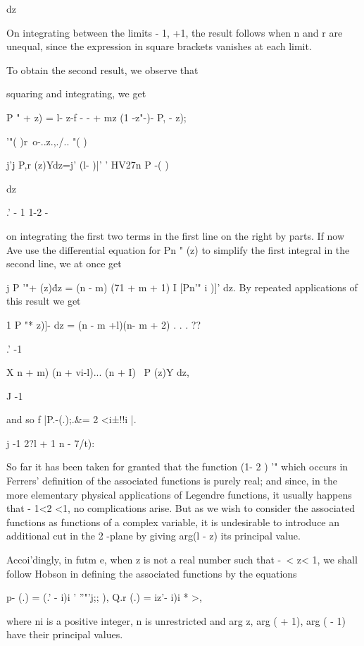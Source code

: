 {{{dz

%
%

On integrating between the limits - 1, +1, the result follows when n
and r are unequal, since the expression in square brackets vanishes at
each limit.

To obtain the second result, we observe that

squaring and integrating, we get

P " + z) = l- z-f - - + mz (1 -z"-)- P, - z);

  '"( )r\ o-..z.,./.. "( )

j'j P,r (z)Ydz=j' (l- )|' ' HV27n P -( )

dz

.' - 1 1-2 -

on integrating the first two terms in the first line on the right by
parts. If now Ave use the differential equation for Pn " (z) to
simplify the first integral in the second line, we at once get

j P '"+ (z)\' dz = (n - m) (71 + m + 1) I [Pn'" i )]' dz. By repeated
applications of this result we get

1 P "* z)]- dz = (n - m +l)(n- m + 2) . . . ??

.' -1

X n + m) (n + vi-l)... (n + I) \ P (z)Y dz,

J -1

and so f |P.-(.);.\&= 2 <i±!!i |.

j -1 2?l + 1 n - 7/t):


So far it has been taken for granted that the function (1- 2 ) '"
which occurs in Ferrers' definition of the associated functions is
purely real; and since, in the more elementary physical applications
of Legendre functions, it usually happens that - 1<2 <1, no
complications arise. But as we wish to consider the associated
functions as functions of a complex variable, it is undesirable to
introduce an additional cut in the 2 -plane by giving arg(l - z) its
principal value.

Accoi'dingly, in futm e, when z is not a real number such that -\ < z<
1, we shall follow Hobson in defining the associated functions by the
equations

p- (.) = (.' - i)i ' ''"'j;; ), Q.r (.) = iz'- i)i * >,

where ni is a positive integer, n is unrestricted and arg z, arg ( +
1), arg ( - 1) have their principal values.

}}}
